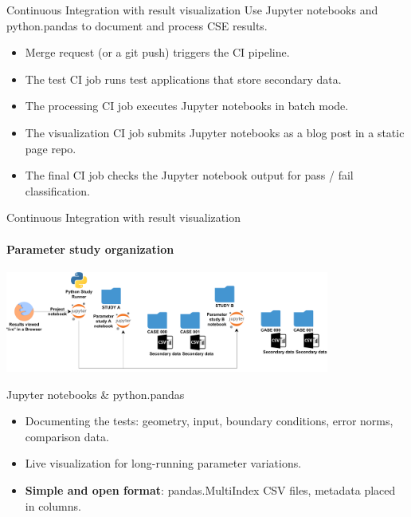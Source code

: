 \documentclass[
	ngerman,%
	aspectratio=169,%
	color={accentcolor=2d},
	logo=true,%
	colorframetitle=true,%
	]{tudabeamer}
\begin{document}
\begin{frame}{Continuous Integration with result visualization} 
	\vfill
	Use Jupyter notebooks and python.pandas to document and process CSE results. 
	\begin{itemize}
		\item Merge request (or a git push) triggers the CI pipeline.
		\item The test CI job runs test applications that store secondary data. 
		\item The processing CI job executes Jupyter notebooks in batch mode.  
		\item The visualization CI job submits Jupyter notebooks as a blog post in a static page repo. 
		\item The final CI job checks the Jupyter notebook output for pass / fail classification. 
	\end{itemize}

\end{frame}

\begin{frame}{Continuous Integration with result visualization} 
	\framesubtitle{Parameter study organization}
	
	\begin{center}
		\includegraphics[width=0.8\textwidth]{figures/Cluster-Parameter-Study-Organization.pdf}
	\end{center}

	Jupyter notebooks \& python.pandas
	\begin{itemize}
		\item Documenting the tests: geometry, input, boundary conditions, error norms, comparison data.
		\item Live visualization for long-running parameter variations. 
		\item \textbf{Simple and open format}: pandas.MultiIndex CSV files, metadata placed in columns. 
	\end{itemize}

\end{frame}

	
\end{document}
